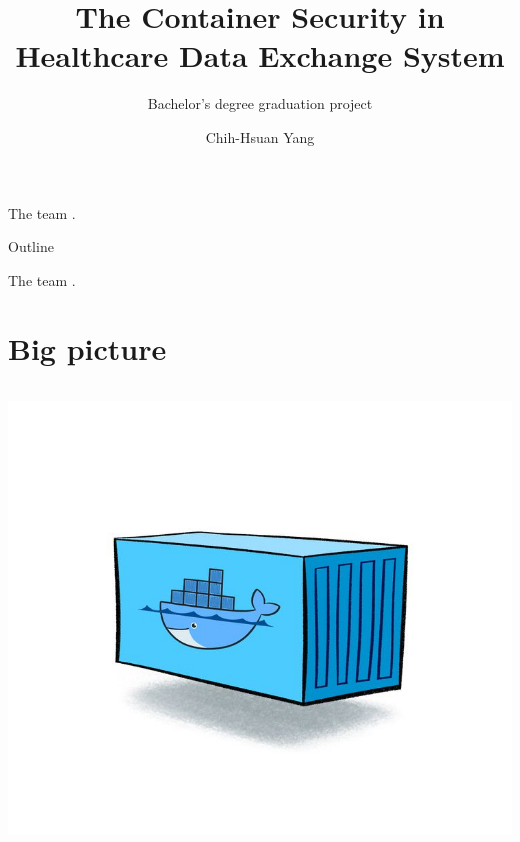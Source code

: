 \documentclass{beamer}
\title{The Container Security in Healthcare Data Exchange System}
\subtitle{Bachelor's degree graduation project}
\author{Chih-Hsuan Yang}
\institute{National Sun Yat-sen University\\
Advisor: Chun-I Fan
}
\date{}
\begin{document}
\begin{CJK*}{UTF8}{bsmi}

    \begin{frame}
        \titlepage
        \centering
        The team {\fontsize{60}{60}}.
    \end{frame}

    \begin{frame}{Outline}
        \begin{multicols}{2}
            \tableofcontents
        \end{multicols}
        \centering
        The team {\fontsize{60}{60}}.
    \end{frame}

    \section{Big picture}
    \begin{frame}
        \begin{columns}
            \begin{column}{0.30\textwidth}
                \centering
                \includegraphics[height=0.4\textheight, trim=150 100 100 100,clip]{container.jpg}
\end{column}
\end{columns}
\end{frame}
\end{CJK*}
\end{document}
